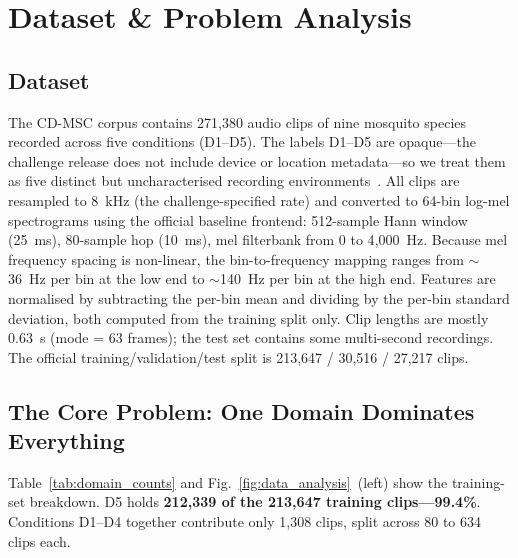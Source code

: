 \section{Dataset \& Problem Analysis}
\label{sec:data}

\subsection{Dataset}
\label{sec:data:dataset}

The CD-MSC corpus contains 271,380 audio clips of nine mosquito
species recorded across five conditions (D1--D5).
The labels D1--D5 are opaque---the challenge release does not
include device or location metadata---so we treat them as five distinct
but uncharacterised recording environments~\cite{biodcase2026}.
All clips are resampled to 8~kHz (the challenge-specified rate) and
converted to 64-bin log-mel spectrograms using the official baseline
frontend: 512-sample Hann window (25~ms), 80-sample hop (10~ms),
mel filterbank from 0 to 4{,}000~Hz.
Because mel frequency spacing is non-linear, the bin-to-frequency
mapping ranges from $\sim$36~Hz per bin at the low end to
$\sim$140~Hz per bin at the high end.
Features are normalised by subtracting the per-bin mean and dividing
by the per-bin standard deviation, both computed from the training
split only.
Clip lengths are mostly 0.63~s (mode = 63 frames); the test set
contains some multi-second recordings.
The official training/validation/test split is 213,647 / 30,516 /
27,217 clips.

\subsection{The Core Problem: One Domain Dominates Everything}
\label{sec:data:imbalance}

Table~\ref{tab:domain_counts} and Fig.~\ref{fig:data_analysis}~(left)
show the training-set breakdown.
D5 holds \textbf{212,339 of the 213,647 training clips---99.4\%}.
Conditions D1--D4 together contribute only 1,308 clips,
split across 80 to 634 clips each.

